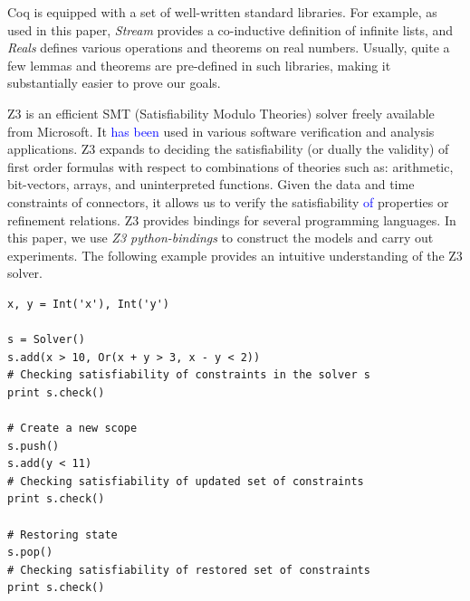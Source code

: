 \documentclass[preprint,3p]{elsarticle}
\newcommand{\liyi}[1]{\textcolor{blue}{#1}}
\newcommand{\xy}[1]{{#1}}
\begin{document}
\xy{Coq is equipped with a set of well-written standard libraries. }For example, as used in
this paper, \emph{Stream} provides a co-inductive
definition of infinite lists, and \emph{Reals} defines various operations and theorems on real
numbers. Usually, quite a few lemmas and theorems are pre-defined in such libraries, making it
substantially easier to prove our goals.




Z3 \cite{MouraB08} is an efficient SMT (Satisfiability Modulo Theories) solver freely available from Microsoft. It \liyi{has been} used in various software verification and analysis applications. \xy{Z3 expands to deciding the satisfiability }(or dually the validity) of first order formulas with respect to combinations of theories such as: arithmetic, bit-vectors, arrays, and uninterpreted functions. Given the data and time constraints of connectors, \xy{it allows us to verify the satisfiability \liyi{of} properties or refinement relations.} Z3 provides bindings for several programming languages. In this paper, we use \emph{Z3 python-bindings} to construct the models and carry out experiments. The following example provides an intuitive understanding of the Z3 solver.
\begin{lstlisting}
x, y = Int('x'), Int('y')

s = Solver()
s.add(x > 10, Or(x + y > 3, x - y < 2))
# Checking satisfiability of constraints in the solver s
print s.check()

# Create a new scope
s.push()
s.add(y < 11)
# Checking satisfiability of updated set of constraints
print s.check()

# Restoring state
s.pop()
# Checking satisfiability of restored set of constraints
print s.check()
\end{lstlisting}
\end{document}
